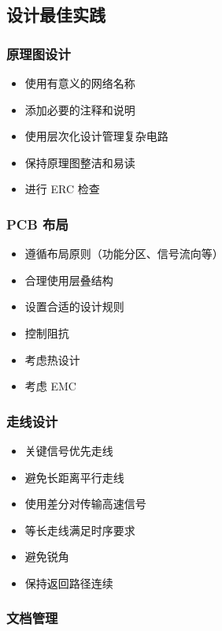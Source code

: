 \subsection{设计最佳实践}

\subsubsection{原理图设计}

\begin{itemize}
  \item 使用有意义的网络名称
  \item 添加必要的注释和说明
  \item 使用层次化设计管理复杂电路
  \item 保持原理图整洁和易读
  \item 进行 ERC 检查
\end{itemize}

\subsubsection{PCB 布局}

\begin{itemize}
  \item 遵循布局原则（功能分区、信号流向等）
  \item 合理使用层叠结构
  \item 设置合适的设计规则
  \item 控制阻抗
  \item 考虑热设计
  \item 考虑 EMC
\end{itemize}

\subsubsection{走线设计}

\begin{itemize}
  \item 关键信号优先走线
  \item 避免长距离平行走线
  \item 使用差分对传输高速信号
  \item 等长走线满足时序要求
  \item 避免锐角
  \item 保持返回路径连续
\end{itemize}

\subsubsection{文档管理}

